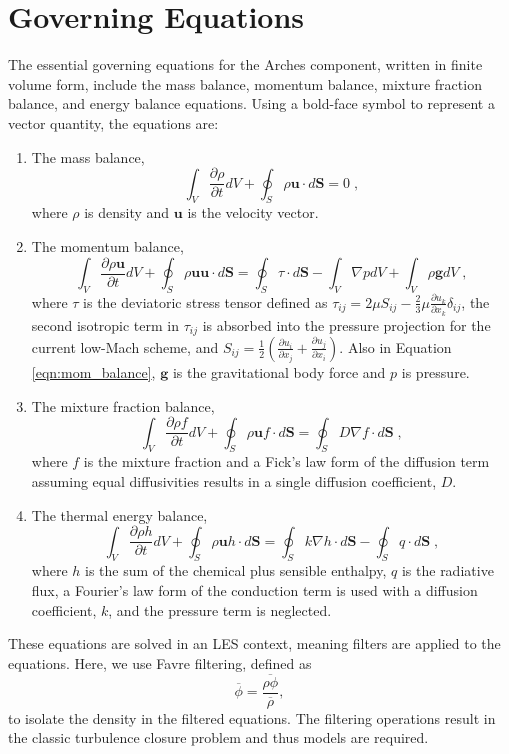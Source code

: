\section{Governing Equations}
%
The essential governing equations for the Arches component, written
in finite volume form, include the mass balance, momentum balance,
mixture fraction balance, and energy balance equations. Using a bold-face
symbol to represent a vector quantity, the equations are: 
\begin{enumerate}
\item The mass balance, \begin{equation}
\int_{V}\frac{\partial\rho}{\partial t}dV+\oint_{S}\rho\mathbf{u}\cdot d\mathbf{S}=0\;,\label{eqn:mass_balance}\end{equation}
 where $\rho$ is density and $\mathbf{u}$ is the velocity vector. 
\item The momentum balance, \begin{equation}
\int_{V}\frac{\partial\rho\mathbf{u}}{\partial t}dV+\oint_{S}\rho\mathbf{uu}\cdot d\mathbf{S}=\oint_{S}\tau\cdot d\mathbf{S}-\int_{V}\nabla pdV+\int_{V}\rho\mathbf{g}dV\;,\label{eqn:mom_balance}\end{equation}
 where $\tau$ is the deviatoric stress tensor defined as $\tau_{ij}=2\mu S_{ij}-\frac{2}{3}\mu\frac{\partial u_{k}}{\partial x_{k}}\delta_{ij}$,
the second isotropic term in $\tau_{ij}$ is absorbed into the pressure
projection for the current low-Mach scheme, and $S_{ij}=\frac{1}{2}\left(\frac{\partial u_{i}}{\partial x_{j}}+\frac{\partial u_{j}}{\partial x_{i}}\right)$.
Also in Equation \ref{eqn:mom_balance}, $\mathbf{g}$ is the gravitational
body force and $p$ is pressure. 
\item The mixture fraction balance, \begin{equation}
\int_{V}\frac{\partial\rho f}{\partial t}dV+\oint_{S}\rho\mathbf{u}f\cdot d\mathbf{S}=\oint_{S}D\nabla f\cdot d\mathbf{S}\;,\label{eqn:species_balance}\end{equation}
 where $f$ is the mixture fraction and a Fick's law form of the diffusion
term assuming equal diffusivities results in a single diffusion coefficient,
$D$. 
\item The thermal energy balance, \begin{equation}
\int_{V}\frac{\partial\rho h}{\partial t}dV+\oint_{S}\rho\mathbf{u}h\cdot d\mathbf{S}=\oint_{S}k\nabla h\cdot d\mathbf{S}-\oint_{S}q\cdot d\mathbf{S}\;,\label{eqn:heat_balance}\end{equation}
 where $h$ is the sum of the chemical plus sensible enthalpy, $q$
is the radiative flux, a Fourier's law form of the conduction term
is used with a diffusion coefficient, $k$, and the pressure term
is neglected. 
\end{enumerate}
These equations are solved in an LES context, meaning filters are
applied to the equations. Here, we use Favre filtering, defined as
\[
\overline{\phi}=\frac{\overline{\rho\phi}}{\overline{\rho}},\]
 to isolate the density in the filtered equations. The filtering operations
result in the classic turbulence closure problem and thus models are
required. 

